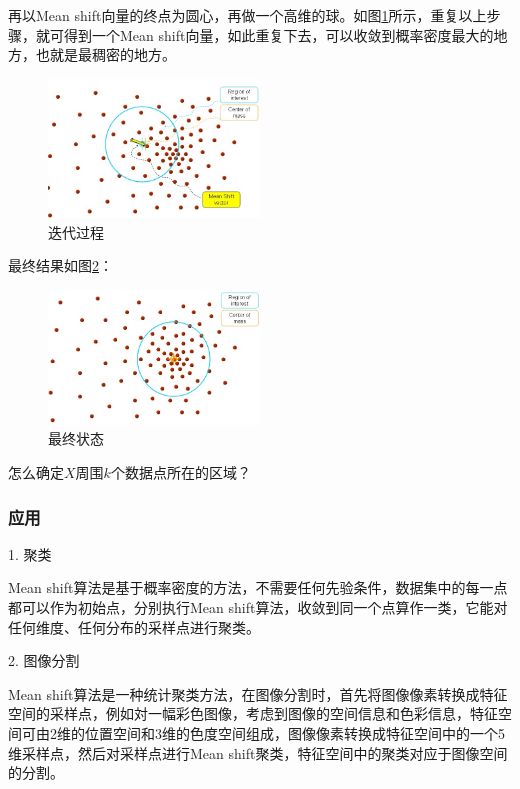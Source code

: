 \documentclass[12pt]{article}
\begin{document}
再以Mean shift向量的终点为圆心，再做一个高维的球。如图\ref{fig: meanshift2}所示，重复以上步骤，就可得到一个Mean shift向量，如此重复下去，可以收敛到概率密度最大的地方，也就是最稠密的地方。

\begin{figure}[!ht]
\centering
\includegraphics[width=0.5\textwidth]{meanshift2.jpg}
\caption{迭代过程}
\label{fig: meanshift2}
\end{figure} 

最终结果如图\ref{fig: meanshift3}：

\begin{figure}[!ht]
\centering
\includegraphics[width=0.5\textwidth]{meanshift3.jpg}
\caption{最终状态}
\label{fig: meanshift3}
\end{figure} 

怎么确定$X$周围$k$个数据点所在的区域？


\subsubsection{应用}

1. 聚类

Mean shift算法是基于概率密度的方法，不需要任何先验条件，数据集中的每一点都可以作为初始点，分别执行Mean shift算法，收敛到同一个点算作一类，它能对任何维度、任何分布的采样点进行聚类。

2. 图像分割

Mean shift算法是一种统计聚类方法，在图像分割时，首先将图像像素转换成特征空间的采样点，例如対一幅彩色图像，考虑到图像的空间信息和色彩信息，特征空间可由2维的位置空间和3维的色度空间组成，图像像素转换成特征空间中的一个5维采样点，然后对采样点进行Mean shift聚类，特征空间中的聚类对应于图像空间的分割。
\end{document}

